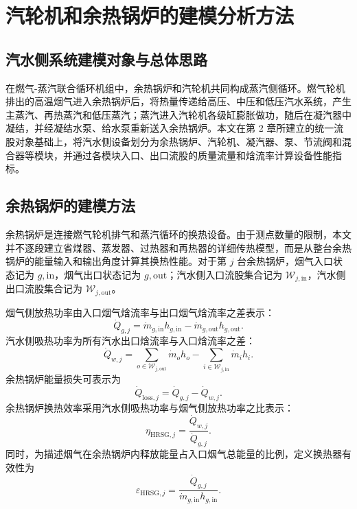 \chapter{汽轮机和余热锅炉的建模分析方法}

\section{汽水侧系统建模对象与总体思路}

在燃气-蒸汽联合循环机组中，余热锅炉和汽轮机共同构成蒸汽侧循环。燃气轮机排出的高温烟气进入余热锅炉后，将热量传递给高压、中压和低压汽水系统，产生主蒸汽、再热蒸汽和低压蒸汽；蒸汽进入汽轮机各级缸膨胀做功，随后在凝汽器中凝结，并经凝结水泵、给水泵重新送入余热锅炉。本文在第 2 章所建立的统一流股对象基础上，将汽水侧设备划分为余热锅炉、汽轮机、凝汽器、泵、节流阀和混合器等模块，并通过各模块入口、出口流股的质量流量和焓流率计算设备性能指标。

\section{余热锅炉的建模方法}

余热锅炉是连接燃气轮机排气和蒸汽循环的换热设备。由于测点数量的限制，本文并不逐段建立省煤器、蒸发器、过热器和再热器的详细传热模型，而是从整台余热锅炉的能量输入和输出角度计算其换热性能。对于第 $j$ 台余热锅炉，烟气入口状态记为 $g,\mathrm{in}$，烟气出口状态记为 $g,\mathrm{out}$；汽水侧入口流股集合记为 $\mathcal{W}_{j,\mathrm{in}}$，汽水侧出口流股集合记为 $\mathcal{W}_{j,\mathrm{out}}$。

烟气侧放热功率由入口烟气焓流率与出口烟气焓流率之差表示：
\begin{equation}\label{eq:hrsg-gas-heat}
\dot{Q}_{g,j}
=
\dot{m}_{g,\mathrm{in}}h_{g,\mathrm{in}}
-
\dot{m}_{g,\mathrm{out}}h_{g,\mathrm{out}}.
\end{equation}
汽水侧吸热功率为所有汽水出口焓流率与入口焓流率之差：
\begin{equation}\label{eq:hrsg-water-heat}
\dot{Q}_{w,j}
=
\sum_{o\in\mathcal{W}_{j,\mathrm{out}}}\dot{m}_o h_o
-
\sum_{i\in\mathcal{W}_{j,\mathrm{in}}}\dot{m}_i h_i.
\end{equation}
余热锅炉能量损失可表示为
\begin{equation}\label{eq:hrsg-heat-loss}
\dot{Q}_{\mathrm{loss},j}
=
\dot{Q}_{g,j}
-
\dot{Q}_{w,j}.
\end{equation}
余热锅炉换热效率采用汽水侧吸热功率与烟气侧放热功率之比表示：
\begin{equation}\label{eq:hrsg-efficiency}
\eta_{\mathrm{HRSG},j}
=
\frac{\dot{Q}_{w,j}}{\dot{Q}_{g,j}}.
\end{equation}
同时，为描述烟气在余热锅炉内释放能量占入口烟气总能量的比例，定义换热器有效性为
\begin{equation}\label{eq:hrsg-effectiveness}
\varepsilon_{\mathrm{HRSG},j}
=
\frac{\dot{Q}_{g,j}}{\dot{m}_{g,\mathrm{in}}h_{g,\mathrm{in}}}.
\end{equation}

